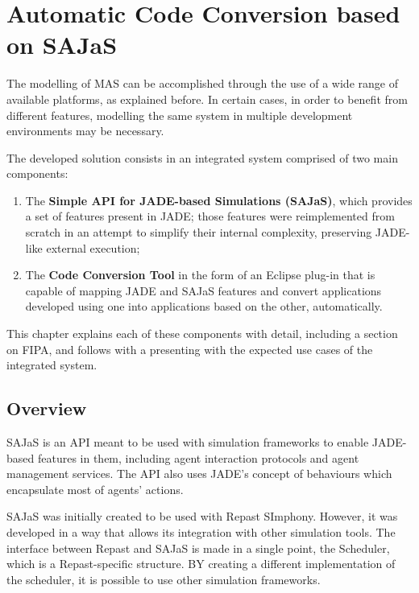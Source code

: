 \chapter{Automatic Code Conversion based on SAJaS}
\label{chap:solution}

The modelling of MAS can be accomplished through the use of a wide range of available platforms, as explained before. In certain cases, in order to benefit from different features, modelling the same system in multiple development environments may be necessary.

The developed solution consists in an integrated system comprised of two main components:

\begin{enumerate}
  \item The \textbf{Simple API for JADE-based Simulations (SAJaS)}, which provides a set of features present in JADE; those features were reimplemented from scratch in an attempt to simplify their internal complexity, preserving JADE-like external execution;
  \item The \textbf{Code Conversion Tool} in the form of an Eclipse plug-in that is capable of mapping JADE and SAJaS features and convert applications developed using one into applications based on the other, automatically.
\end{enumerate}

This chapter explains each of these components with detail, including a section on FIPA, and follows with a presenting with the expected use cases of the integrated system.

\section{Overview}

SAJaS is an API meant to be used with simulation frameworks to enable JADE-based features in them, including agent interaction protocols and agent management services. The API also uses JADE's concept of behaviours which encapsulate most of agents' actions.

SAJaS was initially created to be used with Repast SImphony. However, it was developed in a way that allows its integration with other simulation tools. The interface between Repast and SAJaS is made in a single point, the Scheduler, which is a Repast-specific structure. BY creating a different implementation of the scheduler, it is possible to use other simulation frameworks.

